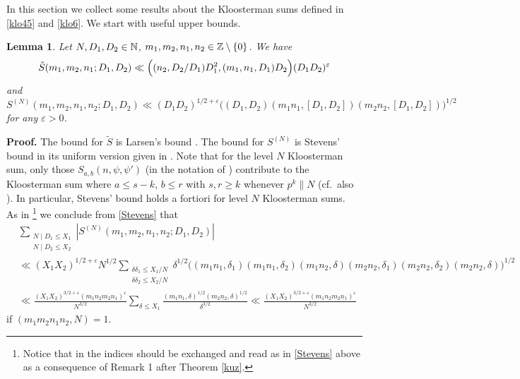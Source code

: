 \documentclass[11pt]{amsart}
\theoremstyle{plain}
\newtheorem{lemma}{Lemma}
\numberwithin{equation}{section}
\theoremstyle{definition}
\renewcommand{\geq}{\geqslant}
\renewcommand{\leq}{\leqslant}
\begin{document}
In this section we collect some  results about the  Kloosterman sums defined in \eqref{klo45} and  \eqref{klo6}.   We start with useful upper bounds. 
 
\begin{lemma}\label{lem1} Let $N, D_1, D_2 \in \Bbb{N}$, $m_1, m_2, n_1, n_2 \in \Bbb{Z} \setminus \{0\}$.  We have
$$\tilde{S}(m_1, m_2, n_1; D_1, D_2) \ll \Bigl((n_2, D_2/D_1)D_1^2, (m_1, n_1, D_1)D_2\Bigr) (D_1D_2)^{\varepsilon}$$
 and
 \begin{equation}\label{Stevens}
S^{(N)}(m_1, m_2, n_1, n_2;  D_1, D_2) \ll (D_1D_2)^{1/2 + \varepsilon}\bigl((D_1, D_2)(m_1n_1, [D_1, D_2])(m_2n_2, [D_1, D_2])\bigr)^{1/2}
\end{equation}
for any $\varepsilon > 0$. 
\end{lemma} 
 
\textbf{Proof.} The bound for $\tilde{S}$ is Larsen's bound \cite[Appendix]{BFG}. The bound for $S^{(N)}$ is Stevens' bound \cite[Theorem 5.1]{St} in its uniform version given in \cite[p.\ 39]{Bu}. Note that for the level $N$ Kloosterman sum, only those $S_{a, b}(n, \psi, \psi')$ (in the notation of \cite[Section 5]{St}) contribute to the Kloosterman sum where $a \leq s-k$, $b \leq r$ with $s, r \geq k$ whenever $p^k \parallel N$ (cf.\ also \cite[Remark 2.5]{DF}). In particular, Stevens' bound holds a fortiori for level $N$ Kloosterman sums.\\ %


As in \cite[Lemma 3]{Bl}\footnote{Notice that  in \cite[Lemma 3]{Bl} the indices should be exchanged and read as in \eqref{Stevens} above as a consequence of Remark 1 after Theorem \ref{kuz}.} we conclude from \eqref{Stevens} that 
\begin{equation}\label{average}
\begin{split}
&\sum_{\substack{N \mid D_1 \leq X_1 \\ N \mid D_2 \leq X_2}}  |S^{(N)}(m_1, m_2, n_1, n_2; D_1, D_2) | \\
&\ll (X_1X_2)^{1/2+\varepsilon}N^{1/2} \sum_{\substack{\delta \delta_1 \leq X_1/N\\ \delta \delta_2 \leq X_2/N}}\delta^{1/2} \bigl((m_1n_1, \delta_1)(m_1n_1, \delta_2) (m_1n_2, \delta) (m_2n_2, \delta_1) (m_2n_2, \delta_2) (m_2n_2, \delta)\bigr)^{1/2}   \\
&\ll \frac{(X_1X_2)^{3/2+\varepsilon}(m_1n_2 m_2n_1)^{\varepsilon}}{N^{3/2}} \sum_{\delta \leq X_1} \frac{(m_1n_1, \delta)^{1/2}(m_2n_2, \delta)^{1/2}}{\delta^{3/2}} \ll \frac{(X_1X_2)^{3/2+\varepsilon}(m_1n_2 m_2n_1)^{\varepsilon}}{N^{3/2}} 
\end{split}
\end{equation}
if $(m_1m_2n_1n_2, N) = 1$.  
\end{document}
